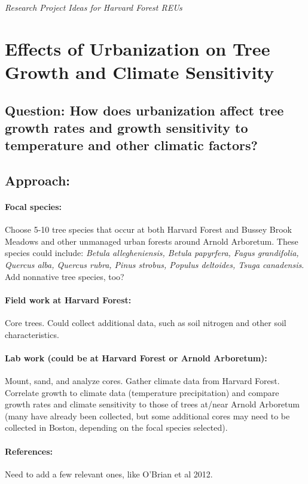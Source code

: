 \documentclass[11pt]{article}
\begin{document}
\noindent \emph{\LARGE Research Project Ideas for Harvard Forest REUs}

\section{Effects of Urbanization on Tree Growth and Climate Sensitivity}
\subsection{Question: How does urbanization affect tree growth rates and growth sensitivity to temperature and other climatic factors?}
\subsection{Approach:}
\paragraph {Focal species:} Choose 5-10 tree species that occur at both Harvard Forest and Bussey Brook Meadows and other unmanaged urban forests around Arnold Arboretum. These species could include: \emph{Betula allegheniensis, Betula papyrfera, Fagus grandifolia, Quercus alba, Quercus rubra, Pinus strobus, Populus deltoides, Tsuga canadensis}. Add nonnative tree species, too?
\paragraph {Field work at Harvard Forest:} Core trees. Could collect additional data, such as soil nitrogen and other soil characteristics. 
\paragraph {Lab work (could be at Harvard Forest or Arnold Arboretum):} Mount, sand, and analyze cores. Gather climate data from Harvard Forest. Correlate growth to climate data (temperature precipitation) and compare growth rates and climate sensitivity to those of trees at/near Arnold Arboretum (many have already been collected, but some additional cores may need to be collected in 
Boston, depending on the focal species selected).
\paragraph {References:} Need to add a few relevant ones, like O'Brian et al 2012.

\section{}
\subsection{}
\paragraph {}

\end{document}
